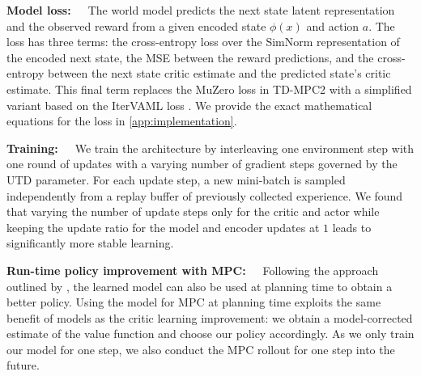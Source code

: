 \textbf{Model loss:}~~~The world model predicts the next state latent representation and the observed reward from a given encoded state $\phi(x)$ and action $a$. The loss has three terms: the cross-entropy loss over the SimNorm representation of the encoded next state, the MSE between the reward predictions, and the cross-entropy between the next state critic estimate and the predicted state's critic estimate.
This final term replaces the MuZero loss in TD-MPC2 with a simplified variant based on the IterVAML loss \parencite{itervaml}.
We provide the exact mathematical equations for the loss in \autoref{app:implementation}.


\textbf{Training:}~~~We train the architecture by interleaving one environment step with one round of updates with a varying number of gradient steps governed by the UTD parameter.
For each update step, a new mini-batch is sampled independently from a replay buffer of previously collected experience.
We found that varying the number of update steps only for the critic and actor while keeping the update ratio for the model and encoder updates at $1$ leads to significantly more stable learning.

\textbf{Run-time policy improvement with MPC:}~~~Following the approach outlined by  \textcite{hansen2022temporal}, the learned model can also be used at planning time to obtain a better policy.
Using the model for MPC at planning time exploits the same benefit of models as the critic learning improvement: we obtain a model-corrected estimate of the value function and choose our policy accordingly.
As we only train our model for one step, we also conduct the MPC rollout for one step into the future.

